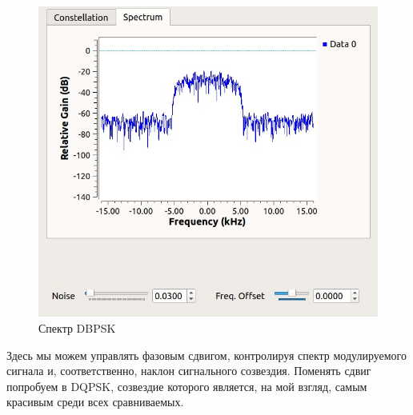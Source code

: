 	\begin{figure}[H]
		\begin{center}
			\includegraphics[scale=0.4]{../dbpsk_spectrum.jpg}
			\caption{Спектр DBPSK} 
		\end{center}
	\end{figure}
	Здесь мы можем управлять фазовым сдвигом, контролируя спектр модулируемого сигнала и, соответственно, наклон сигнального созвездия. Поменять сдвиг попробуем в DQPSK, созвездие которого является, на мой взгляд, самым красивым среди всех сравниваемых.

